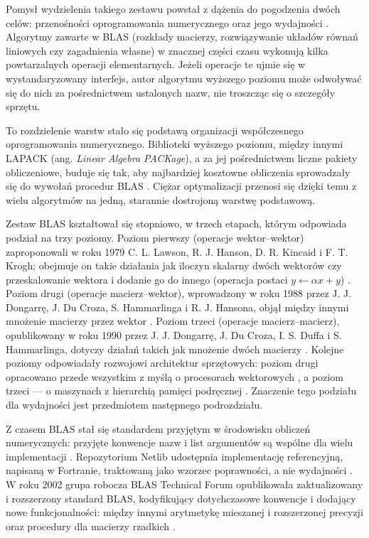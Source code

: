 \documentclass[a4paper,12pt]{book} %
\begin{document}
Pomysł wydzielenia takiego zestawu powstał z dążenia do pogodzenia dwóch celów: przenośności oprogramowania numerycznego oraz jego wydajności \cite{lawson1979blas}. Algorytmy zawarte w BLAS (rozkłady macierzy, rozwiązywanie układów równań liniowych czy zagadnienia własne) w znacznej części czasu wykonują kilka powtarzalnych operacji elementarnych. Jeżeli operacje te ujmie się w wystandaryzowany interfejs, autor algorytmu wyższego poziomu może odwoływać się do nich za pośrednictwem ustalonych nazw, nie troszcząc się o szczegóły sprzętu. 

To rozdzielenie warstw stało się podstawą organizacji współczesnego oprogramowania numerycznego. Biblioteki wyższego poziomu, między innymi LAPACK (ang. \emph{Linear Algebra PACKage}), a za jej pośrednictwem liczne pakiety obliczeniowe, buduje się tak, aby najbardziej kosztowne obliczenia sprowadzały się do wywołań procedur BLAS \cite{blackford2002blas}. Ciężar optymalizacji przenosi się dzięki temu z wielu algorytmów na jedną, starannie dostrojoną warstwę podstawową.

Zestaw BLAS kształtował się stopniowo, w trzech etapach, którym odpowiada podział na trzy poziomy. Poziom pierwszy (operacje wektor--wektor) zaproponowali w roku 1979 C. L. Lawson, R. J. Hanson, D. R. Kincaid i F. T. Krogh; obejmuje on takie działania jak iloczyn skalarny dwóch wektorów czy przeskalowanie wektora i dodanie go do innego (operacja postaci $y \leftarrow \alpha x + y$) \cite{lawson1979blas}. Poziom drugi (operacje macierz--wektor), wprowadzony w roku 1988 przez J. J. Dongarrę, J. Du Croza, S. Hammarlinga i R. J. Hansona, objął między innymi mnożenie macierzy przez wektor \cite{dongarra1988blas2}. Poziom trzeci (operacje macierz--macierz), opublikowany w roku 1990 przez J. J. Dongarrę, J. Du Croza, I. S. Duffa i S. Hammarlinga, dotyczy działań takich jak mnożenie dwóch macierzy \cite{dongarra1990blas3}. Kolejne poziomy odpowiadały rozwojowi architektur sprzętowych: poziom drugi opracowano przede wszystkim z myślą o procesorach wektorowych \cite{dongarra1988blas2}, a poziom trzeci --- o maszynach z hierarchią pamięci podręcznej \cite{dongarra1990blas3}. Znaczenie tego podziału dla wydajności jest przedmiotem następnego podrozdziału.

Z czasem BLAS stał się standardem przyjętym w środowisku obliczeń numerycznych: przyjęte konwencje nazw i list argumentów są wspólne dla wielu implementacji \cite{blackford2002blas}. Repozytorium Netlib udostępnia implementację referencyjną, napisaną w Fortranie, traktowaną jako wzorzec poprawności, a nie wydajności \cite{netlib_blas}. W roku 2002 grupa robocza BLAS Technical Forum opublikowała zaktualizowany i rozszerzony standard BLAS, kodyfikujący dotychczasowe konwencje i dodający nowe funkcjonalności: między innymi arytmetykę mieszanej i rozszerzonej precyzji oraz procedury dla macierzy rzadkich \cite{blackford2002blas}.
\end{document}
